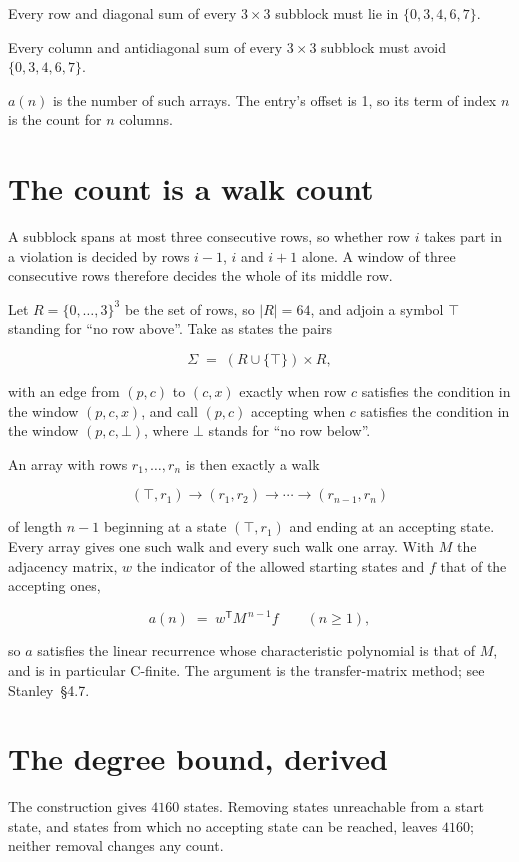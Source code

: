 \documentclass[11pt]{article}
\theoremstyle{definition}
\begin{document}
Every row and diagonal sum of every $3\times3$ subblock must lie in $\{0, 3, 4, 6, 7\}$.

Every column and antidiagonal sum of every $3\times3$ subblock must avoid $\{0, 3, 4, 6, 7\}$.

$a(n)$ is the number of such arrays. The entry's offset is 1, so its term of index $n$ is the count for $n$ columns.

\section{The count is a walk count}

A subblock spans at most three consecutive rows, so whether row $i$ takes part in a violation is decided by rows $i-1$, $i$ and $i+1$ alone. A window of three consecutive rows therefore decides the whole of its middle row.

Let $R = \{0,\dots,3\}^{3}$ be the set of rows, so $|R| = 64$, and adjoin a symbol $\top$ standing for ``no row above''. Take as states the pairs

\[\Sigma \;=\; (R \cup \{\top\}) \times R,\]

with an edge from $(p,c)$ to $(c,x)$ exactly when row $c$ satisfies the condition in the window $(p,c,x)$, and call $(p,c)$ accepting when $c$ satisfies the condition in the window $(p,c,\bot)$, where $\bot$ stands for ``no row below''.

An array with rows $r_1,\dots,r_n$ is then exactly a walk

\[(\top,r_1) \to (r_1,r_2) \to \cdots \to (r_{n-1},r_n)\]

of length $n-1$ beginning at a state $(\top,r_1)$ and ending at an accepting state. Every array gives one such walk and every such walk one array. With $M$ the adjacency matrix, $w$ the indicator of the allowed starting states and $f$ that of the accepting ones,

\[a(n) \;=\; w^{\mathsf T} M^{\,n-1} f \qquad (n \ge 1),\]

so $a$ satisfies the linear recurrence whose characteristic polynomial is that of $M$, and is in particular C-finite. The argument is the transfer-matrix method; see Stanley~\S4.7.

\section{The degree bound, derived}

The construction gives $4160$ states. Removing states unreachable from a start state, and states from which no accepting state can be reached, leaves $4160$; neither removal changes any count.
\end{document}
